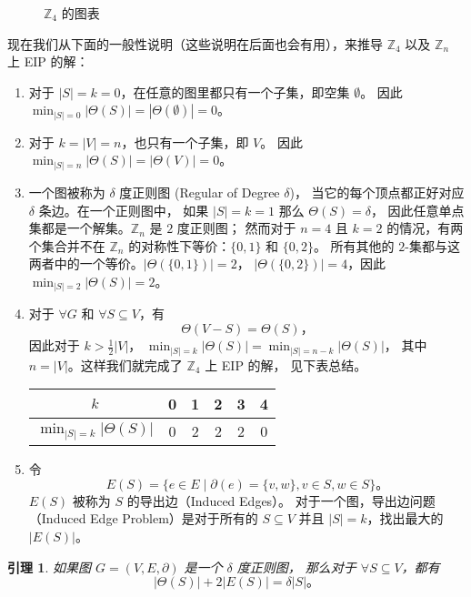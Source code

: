 \documentclass[12pt, a4paper]{article}
\newtheorem{lemma}{引理}
\begin{document}
\begin{figure}
	\centering
	\caption{$\mathbb{Z}_4$ 的图表}
	\label{Figure 1}
\end{figure}

现在我们从下面的一般性说明（这些说明在后面也会有用），来推导 $\mathbb{Z}_4$ 以及
$\mathbb{Z}_n$ 上 EIP 的解：

\begin{enumerate}[(1)]
	\item 对于 $|S| = k = 0$，在任意的图里都只有一个子集，即空集 $\emptyset$。
		因此 $\min_{|S| = 0}|\Theta(S)| = |\Theta(\emptyset)| = 0$。
	\item 对于 $k = |V| = n$，也只有一个子集，即 $V$。
		因此 $\min_{|S| = n}|\Theta(S)| = |\Theta(V)| = 0$。
	\item 一个图被称为 $\delta$ 度正则图 (Regular of Degree $\delta$)，
		当它的每个顶点都正好对应 $\delta$ 条边。在一个正则图中，
		如果 $|S| = k = 1$ 那么 $\Theta(S) = \delta$，
		因此任意单点集都是一个解集。$\mathbb{Z}_n$ 是 $2$ 度正则图；
		然而对于 $n = 4$ 且 $k = 2$ 的情况，有两个集合并不在 $\mathbb{Z}_n$
		的对称性下等价：$\{0, 1\}$ 和 $\{0, 2\}$。
		所有其他的 $2$-集都与这两者中的一个等价。$|\Theta(\{0, 1\})| = 2$，
		$|\Theta(\{0, 2\})| = 4$，因此 $\min_{|S| = 2}|\Theta(S)| = 2$。
	\item 对于 $\forall G$ 和 $\forall S \subseteq V$，有
		$$\Theta(V − S) = \Theta(S)，$$
		因此对于 $k > \frac{1}{2}|V|$，
		$\min_{|S| = k}|\Theta(S)| = \min_{|S| = n − k}|\Theta(S)|$，
		其中 $n = |V|$。这样我们就完成了 $\mathbb{Z}_4$ 上 EIP 的解，
		见下表总结。
		\begin{center}
			\begin{tabular}{ c | c c c c c }
			$k$                         & 0 & 1 & 2 & 3 & 4 \\
			\hline
			$\min_{|S| = k}|\Theta(S)|$ & 0 & 2 & 2 & 2 & 0 \\
			\end{tabular}
		\end{center}
	\item 令
		$$E(S) = \{e \in E \mid \partial(e) = \{v, w\}, v \in S, w \in S\}。$$
		$E(S)$ 被称为 $S$ 的导出边（Induced Edges）。
		对于一个图，导出边问题（Induced Edge Problem）是对于所有的
		$S \subseteq V$ 并且 $|S| = k$，找出最大的 $|E(S)|$。
\end{enumerate}

\begin{lemma}
\label{Lemma 1}
如果图 $G = (V, E, \partial)$ 是一个 $\delta$ 度正则图，
那么对于 $\forall S \subseteq V$，都有
$$|\Theta(S)| + 2|E(S)| = \delta|S|。$$
\end{lemma}
\end{document}
